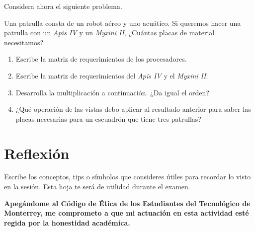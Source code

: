 \documentclass[spanish, 10pt]{article}
\begin{document}
\pagebreak

Considera ahora el siguiente problema.

Una patrulla consta de un robot aéreo y uno acuático.
Si queremos hacer una patrulla con un \textit{Apis IV} y un \textit{Myxini II}, ¿Cuántas placas de material necesitamos?

\bigskip

\begin{enumerate}
    \itemsep15ex
    \item Escribe la matriz de requerimientos de los procesadores.
    \item Escribe la matriz de requerimientos del \textit{Apis IV} y el \textit{Myxini II}.
    \item Desarrolla la multiplicación a continuación. ¿Da igual el orden?
    \item ¿Qué operación de las vistas debo aplicar al resultado anterior para saber las placas necesarias para un escuadrón que tiene tres patrullas?
\end{enumerate}

\section{Reflexión}

Escribe los conceptos, tips o símbolos que consideres útiles para recordar lo visto en la sesión. Esta hoja te será de utilidad durante el examen.

\vfill

\textbf{Apegándome al Código de Ética de los Estudiantes del Tecnológico de Monterrey, me comprometo a que mi actuación en esta actividad esté regida por la honestidad académica.}
\end{document}
